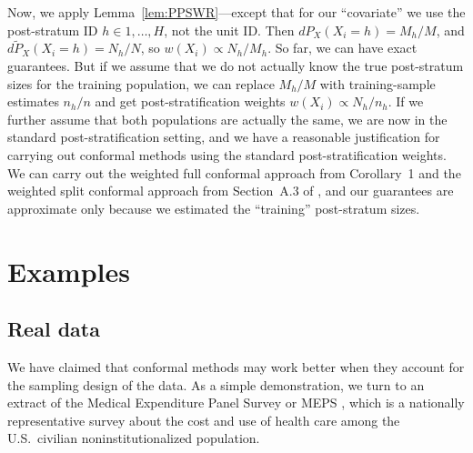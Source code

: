 \documentclass[10.5pt, letterpaper]{article}
\numberwithin{table}{section}
\numberwithin{figure}{section}
\numberwithin{equation}{section}
\begin{document}
Now, we apply Lemma~\ref{lem:PPSWR}---except that for our ``covariate'' we use the post-stratum ID $h \in 1,\ldots,H$, not the unit ID. Then $dP_X(X_i=h)=M_h/M$, and $d\tilde{P}_X(X_i=h) = N_h/N$, so $w(X_i) \propto N_h/M_h$. So far, we can have exact guarantees. But if we assume that we do not actually know the true post-stratum sizes for the training population, we can replace $M_h/M$ with training-sample estimates $n_h/n$ and get post-stratification weights $w(X_i) \propto N_h/n_h$. If we further assume that both populations are actually the same, we are now in the standard post-stratification setting, and we have a reasonable justification for carrying out conformal methods using the standard post-stratification weights. We can carry out the weighted full conformal approach from Corollary~1 and the weighted split conformal approach from Section~A.3 of \cite{tibshirani2019conformal}, and our guarantees are approximate only because we estimated the ``training'' post-stratum sizes.







\section{Examples}\label{sec:Examples}


\subsection{Real data}

%
%
%

We have claimed that conformal methods may work better when they account for the sampling design of the data. As a simple demonstration, we turn to an extract of the Medical Expenditure Panel Survey or MEPS \citep{ahrq2017meps}, which is a nationally representative survey about the cost and use of health care among the U.S.\ civilian noninstitutionalized population.
\end{document}
